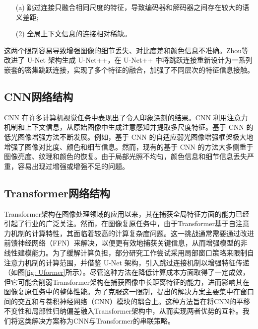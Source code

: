 \documentclass[a4paper]{ctexart}
\begin{document}
	\begin{itemize}
		\item[(a)] 
		跳过连接只融合相同尺度的特征，导致编码器和解码器之间存在较大的语义差距;
		
		\item[(2)]
		全局上下文信息的连接相对稀缺。
	\end{itemize}	
	
	这两个限制容易导致增强图像的细节丢失、对比度差和颜色信息不准确。Zhou等\cite{zhou2018unet++,zhou2019unet++}改进了 U-Net 架构生成 U-Net++，在 U-Net++ 中将跳跃连接重新设计为一系列嵌套的密集跳跃连接，实现了多个特征的融合，加强了不同层次的特征信息接触。
	
	\subsection{CNN网络结构}
	
	CNN 在许多计算机视觉任务中表现出了令人印象深刻的结果。CNN 利用注意力机制\cite{yang2021locally, zhang2020attention}和上下文信息，从原始图像中生成注意感知并提取多尺度特征\cite{li2018multi,zamir2020learning}。基于 CNN 的低光图像增强方法不断发展。例如，基于 CNN 的自适应弱光图像增强框架\cite{li2020visual}极大地增强了图像对比度、颜色和细节信息。然而，现有的基于 CNN 的方法大多侧重于图像亮度、纹理和颜色的恢复\cite{xu2020learning}。由于局部光照不均匀，颜色信息和细节信息丢失严重，容易出现过增强或增强不足的问题。
	
	\subsection{Transformer网络结构}
	
	Transformer架构\cite{vaswani2017attention}在图像处理领域的应用以来\cite{dosovitskiy2020image}，其在捕获全局特征方面的能力已经引起了行业的广泛关注。然而，在图像复原任务中，由于Transformer基于自注意力机制的计算特性，其面临着较高的计算复杂度问题。这一挑战通常需要通过改进前馈神经网络（FFN）来解决，以便更有效地捕获关键信息，从而增强模型的非线性建模能力\cite{wang2022ultrahighdefinition}。为了缓解计算负担，部分研究工作尝试采用局部窗口策略来限制自注意力机制的计算范围，并借鉴 U-Net 架构，引入跳过连接机制以增强特征传递\cite{wang2021uformer}（如图\ref{fig: Uformer}所示）。尽管这种方法在降低计算成本方面取得了一定成效，但它可能会削弱Transformer架构在捕获图像中长距离特征的能力，进而影响其在图像复原任务中的整体性能。为了克服这一限制，提出的解决方案\cite{chen2023cross}主要集中在窗口间的交互和与卷积神经网络（CNN）模块的耦合上。这种方法旨在将CNN的平移不变性和局部性归纳偏差融入Transformer架构中，从而实现两者优势的互补。我们将这类解决方案称为CNN与Transformer的串联策略。
	
\end{document}
